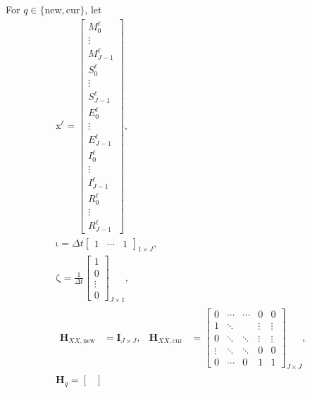 \documentclass[USenglish]{article}
\renewcommand{\vec}[1]{\boldsymbol{\mathrm{#1}}}
\newcommand{\mat}[1]{\mathbf{#1}}
\begin{document}
For $q \in \{\mathrm{new}, \mathrm{cur}\}$, let
\begin{subequations}
  \begin{gather}
    \vec{x}^{\ell} =
    \begin{bmatrix}
      M_0^{\ell} \\ \vdots \\ M_{J - 1}^{\ell} \\
      S_0^{\ell} \\ \vdots \\ S_{J - 1}^{\ell} \\
      E_0^{\ell} \\ \vdots \\ E_{J - 1}^{\ell} \\
      I_0^{\ell} \\ \vdots \\ I_{J - 1}^{\ell} \\
      R_0^{\ell} \\ \vdots \\ R_{J - 1}^{\ell}
    \end{bmatrix},
    \\
    \vec{\iota} =
    \Delta t
    \begin{bmatrix}
      1 & \cdots & 1
    \end{bmatrix}_{1 \times J},
    \\
    \vec{\zeta} =
    \frac{1}{\Delta t}
    \begin{bmatrix}
      1 \\ 0 \\ \vdots \\ 0
    \end{bmatrix}_{J \times 1},
    \\
    \begin{aligned}
      \mat{H}_{XX, \mathrm{new}} &= \mat{I}_{J \times J},
      &
      \mat{H}_{XX, \mathrm{cur}} &=
      \begin{bmatrix}
        0 & \cdots & \cdots & 0 & 0 \\
        1 & \ddots & & \vdots & \vdots \\
        0 & \ddots & \ddots & \vdots & \vdots \\
        \vdots & \ddots & \ddots & 0 & 0 \\
        0 & \cdots & 0 & 1 & 1
      \end{bmatrix}_{J \times J},
    \end{aligned}
    \\
    \mat{H}_{q} =
    \begin{bmatrix}

\end{bmatrix}
\end{gather}
\end{subequations}
\end{document}
